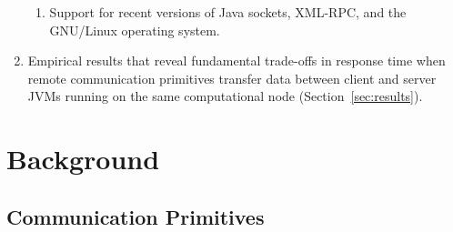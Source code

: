 \documentclass{sig-alternate}
\begin{document}
\begin{enumerate}
\begin{enumerate}
\item Support for recent versions of Java sockets, XML-RPC, and the
  GNU/Linux operating system.

\end{enumerate}

\item Empirical results that reveal fundamental trade-offs in response
  time when remote communication primitives transfer data between
  client and server JVMs running on the same computational node
  (Section~\ref{sec:results}).
 

\end{enumerate}



\section{Background}
\label{sec:background}

\subsection{Communication Primitives}
\label{sec:comm-prim}




\end{document}

